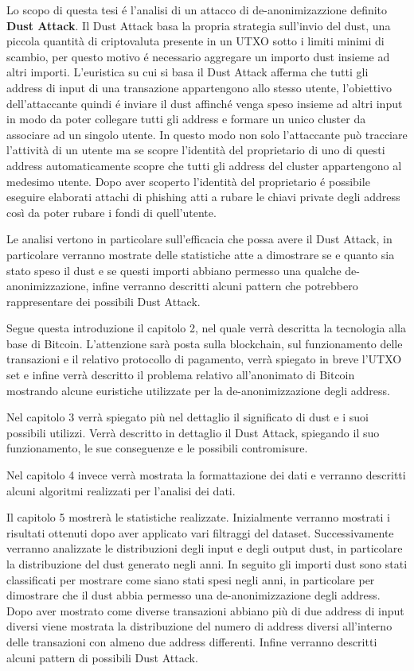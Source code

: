 Lo scopo di questa tesi é l'analisi di un attacco di de-anonimizazzione definito \textbf{Dust Attack}. Il Dust Attack basa la propria strategia sull'invio del dust, una piccola quantità di criptovaluta presente in un UTXO sotto i limiti minimi di scambio, per questo motivo é necessario aggregare un importo dust insieme ad altri importi. L'euristica su cui si basa il Dust Attack afferma che tutti gli address di input di una transazione appartengono allo stesso utente, l'obiettivo dell'attaccante quindi é inviare il dust affinché venga speso insieme ad altri input in modo da poter collegare tutti gli address e formare un unico cluster da associare ad un singolo utente. In questo modo non solo l'attaccante può tracciare l'attività di un utente ma se scopre l'identità del proprietario di uno di questi address automaticamente scopre che tutti gli address del cluster appartengono al medesimo utente. Dopo aver scoperto l'identità del proprietario é possibile eseguire elaborati attachi di phishing atti a rubare le chiavi private degli address così da poter rubare i fondi di quell'utente.

Le analisi vertono in particolare sull'efficacia che possa avere il Dust Attack, in particolare verranno mostrate delle statistiche atte a dimostrare se e quanto sia stato speso il dust e se questi importi abbiano permesso una qualche de-anonimizzazione, infine verranno descritti alcuni pattern che potrebbero rappresentare dei possibili Dust Attack.

Segue questa introduzione il capitolo 2, nel quale verrà descritta la tecnologia alla base di Bitcoin. L'attenzione sarà posta sulla blockchain, sul funzionamento delle transazioni e il relativo protocollo di pagamento, verrà spiegato in breve l'UTXO set e infine verrà descritto il problema relativo all'anonimato di Bitcoin mostrando alcune euristiche utilizzate per la de-anonimizzazione degli address.

Nel capitolo 3 verrà spiegato più nel dettaglio il significato di dust e i suoi possibili utilizzi. Verrà descritto in dettaglio il Dust Attack, spiegando il suo funzionamento, le sue conseguenze e le possibili contromisure.

Nel capitolo 4 invece verrà mostrata la formattazione dei dati e verranno descritti alcuni algoritmi realizzati per l'analisi dei dati.

Il capitolo 5 mostrerà le statistiche realizzate. Inizialmente verranno mostrati i risultati ottenuti dopo aver applicato vari filtraggi del dataset. Successivamente verranno analizzate le distribuzioni degli input e degli output dust, in particolare la distribuzione del dust generato negli anni. In seguito gli importi dust sono stati classificati per mostrare come siano stati spesi negli anni, in particolare per dimostrare che il dust abbia permesso una de-anonimizzazione degli address. Dopo aver mostrato come diverse transazioni abbiano più di due address di input diversi viene mostrata la distribuzione del numero di address diversi all'interno delle transazioni con almeno due address differenti. Infine verranno descritti alcuni pattern di possibili Dust Attack.